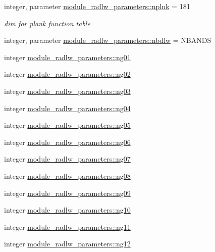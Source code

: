 \begin{DoxyCompactItemize}
integer, parameter \hyperlink{namespacemodule__radlw__parameters_a7ade2de4de94ec6e7a0e97321143e2e6}{module\+\_\+radlw\+\_\+parameters\+::nplnk} = 181
\begin{DoxyCompactList}\small\item\em dim for plank function table \end{DoxyCompactList}\item 
integer, parameter \hyperlink{namespacemodule__radlw__parameters_a39a115a97296886b2e6e37b220e942c7}{module\+\_\+radlw\+\_\+parameters\+::nbdlw} = N\+B\+A\+N\+DS
\item 
integer \hyperlink{namespacemodule__radlw__parameters_a54dc7913677d754af2b7ece9732b1280}{module\+\_\+radlw\+\_\+parameters\+::ng01}
\item 
integer \hyperlink{namespacemodule__radlw__parameters_aed66d66a4da744d27c13b57b41ba78c3}{module\+\_\+radlw\+\_\+parameters\+::ng02}
\item 
integer \hyperlink{namespacemodule__radlw__parameters_ad226d9951e041e991f463a9a90e7f68b}{module\+\_\+radlw\+\_\+parameters\+::ng03}
\item 
integer \hyperlink{namespacemodule__radlw__parameters_afd05a94bc29e5a5d792c0c140fe3a0c4}{module\+\_\+radlw\+\_\+parameters\+::ng04}
\item 
integer \hyperlink{namespacemodule__radlw__parameters_a1e70690afc3ba2cca4344d6df3d26ee8}{module\+\_\+radlw\+\_\+parameters\+::ng05}
\item 
integer \hyperlink{namespacemodule__radlw__parameters_a9a176786a0df1e65165db9b3c6f0e582}{module\+\_\+radlw\+\_\+parameters\+::ng06}
\item 
integer \hyperlink{namespacemodule__radlw__parameters_ab8f22f9ceabf3946452055c461476d49}{module\+\_\+radlw\+\_\+parameters\+::ng07}
\item 
integer \hyperlink{namespacemodule__radlw__parameters_a61aba0726187e15acf8bae5c377dbdd5}{module\+\_\+radlw\+\_\+parameters\+::ng08}
\item 
integer \hyperlink{namespacemodule__radlw__parameters_a2856b7576a44f2e35bd0fbc1e49bd270}{module\+\_\+radlw\+\_\+parameters\+::ng09}
\item 
integer \hyperlink{namespacemodule__radlw__parameters_aa764831e931a2ec27c763ebf957bbc67}{module\+\_\+radlw\+\_\+parameters\+::ng10}
\item 
integer \hyperlink{namespacemodule__radlw__parameters_a239b6c64459896a583e88c8ba2324348}{module\+\_\+radlw\+\_\+parameters\+::ng11}
\item 
integer \hyperlink{namespacemodule__radlw__parameters_a88f3b780d4dc9d4e45852fd41e111a21}{module\+\_\+radlw\+\_\+parameters\+::ng12}

\end{DoxyCompactItemize}
